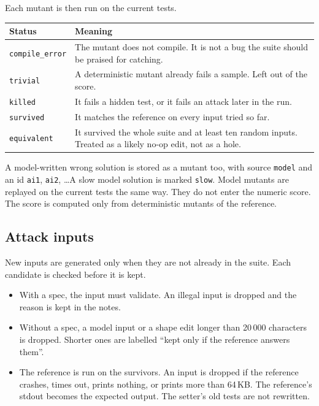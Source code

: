 \documentclass[10pt,a4paper]{article}
\begin{document}
Each mutant is then run on the current tests.

\needspace{4.2cm}
\begin{center}
\small
\begin{tabularx}{\textwidth}{@{}l Y@{}}
\toprule
\textbf{Status} & \textbf{Meaning} \\
\midrule
\texttt{compile\_error} & The mutant does not compile. It is not a bug the suite should be praised for catching. \\
\texttt{trivial} & A deterministic mutant already fails a sample. Left out of the score. \\
\texttt{killed} & It fails a hidden test, or it fails an attack later in the run. \\
\texttt{survived} & It matches the reference on every input tried so far. \\
\texttt{equivalent} & It survived the whole suite and at least ten random inputs. Treated as a likely no-op edit, not as a hole. \\
\bottomrule
\end{tabularx}
\end{center}

A model-written wrong solution is stored as a mutant too, with source \texttt{model} and an id \texttt{ai1}, \texttt{ai2}, \ldots A slow model solution is marked \texttt{slow}. Model mutants are replayed on the current tests the same way. They do not enter the numeric score. The score is computed only from deterministic mutants of the reference.

\subsection{Attack inputs}

New inputs are generated only when they are not already in the suite. Each candidate is checked before it is kept.

\begin{itemize}
  \item With a spec, the input must validate. An illegal input is dropped and the reason is kept in the notes.
  \item Without a spec, a model input or a shape edit longer than 20\,000 characters is dropped. Shorter ones are labelled ``kept only if the reference answers them''.
  \item The reference is run on the survivors. An input is dropped if the reference crashes, times out, prints nothing, or prints more than 64\,KB. The reference's stdout becomes the expected output. The setter's old tests are not rewritten.
\end{itemize}
\end{document}
